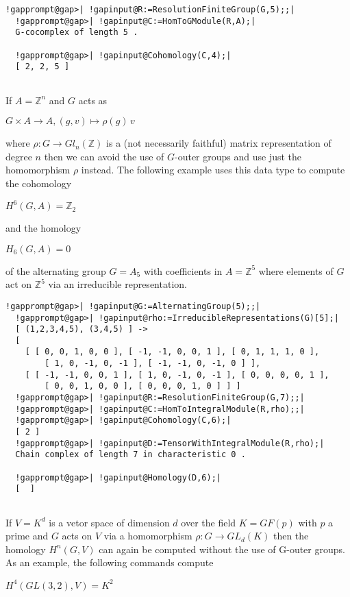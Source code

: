 \documentclass[a4paper,11pt]{report}
\begin{document}
{{\begin{Verbatim}[commandchars=!@|,fontsize=\small,frame=single,label=Example]
  !gapprompt@gap>| !gapinput@R:=ResolutionFiniteGroup(G,5);;|
  !gapprompt@gap>| !gapinput@C:=HomToGModule(R,A);|
  G-cocomplex of length 5 . 
  
  !gapprompt@gap>| !gapinput@Cohomology(C,4);|
  [ 2, 2, 5 ]
  
\end{Verbatim}
 

 If $A=\mathbb Z^n$ and $G$ acts as 

$G\times A \rightarrow A, (g, v) \mapsto \rho(g)\, v $ 

 where $\rho\colon G\rightarrow Gl_n(\mathbb Z)$ is a (not necessarily faithful) matrix representation of degree $n$ then we can avoid the use of $G$-outer groups and use just the homomorphism $\rho$ instead. The following example uses this data type to compute the cohomology 

$H^6(G,A) =\mathbb Z_2 $ 

and the homology 

$H_6(G,A) = 0 $ 

 of the alternating group $G=A_5$ with coefficients in $A=\mathbb Z^5$ where elements of $G$ act on $\mathbb Z^5$ via an irreducible representation. 
\begin{Verbatim}[commandchars=!@|,fontsize=\small,frame=single,label=Example]
  !gapprompt@gap>| !gapinput@G:=AlternatingGroup(5);;|
  !gapprompt@gap>| !gapinput@rho:=IrreducibleRepresentations(G)[5];|
  [ (1,2,3,4,5), (3,4,5) ] -> 
  [ 
    [ [ 0, 0, 1, 0, 0 ], [ -1, -1, 0, 0, 1 ], [ 0, 1, 1, 1, 0 ], 
        [ 1, 0, -1, 0, -1 ], [ -1, -1, 0, -1, 0 ] ], 
    [ [ -1, -1, 0, 0, 1 ], [ 1, 0, -1, 0, -1 ], [ 0, 0, 0, 0, 1 ], 
        [ 0, 0, 1, 0, 0 ], [ 0, 0, 0, 1, 0 ] ] ]
  !gapprompt@gap>| !gapinput@R:=ResolutionFiniteGroup(G,7);;|
  !gapprompt@gap>| !gapinput@C:=HomToIntegralModule(R,rho);;|
  !gapprompt@gap>| !gapinput@Cohomology(C,6);|
  [ 2 ]
  !gapprompt@gap>| !gapinput@D:=TensorWithIntegralModule(R,rho);|
  Chain complex of length 7 in characteristic 0 . 
  
  !gapprompt@gap>| !gapinput@Homology(D,6);|
  [  ]
  
\end{Verbatim}
 

If $V=K^d$ is a vetor space of dimension $d$ over the field $K=GF(p)$ with $p$ a prime and $G$ acts on $V$ via a homomorphism $\rho\colon G\rightarrow GL_d(K)$ then the homology $H^n(G,V)$ can again be computed without the use of G-outer groups. As an example, the
following commands compute 

$H^4(GL(3,2),V) =K^2$ 

}}
\end{document}
